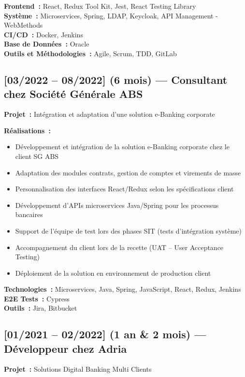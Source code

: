 \textbf{Frontend~:} React, Redux Tool Kit, Jest, React Testing Library\\
\textbf{Système~:} Microservices, Spring, LDAP, Keycloak, API Management - WebMethods\\
\textbf{CI/CD~:} Docker, Jenkins\\
\textbf{Base de Données~:} Oracle\\
\textbf{Outils et Méthodologies~:} Agile, Scrum, TDD, GitLab

\subsection*{[03/2022 -- 08/2022] (6 mois) --- Consultant chez Société Générale ABS}
\vspace{4pt}
\textbf{Projet~:} Intégration et adaptation d'une solution e-Banking corporate

\textbf{Réalisations~:}
\begin{itemize}
    \item Développement et intégration de la solution e-Banking corporate chez le client SG ABS
    \item Adaptation des modules contrats, gestion de comptes et virements de masse
    \item Personnalisation des interfaces React/Redux selon les spécifications client
    \item Développement d'APIs microservices Java/Spring pour les processus bancaires
    \item Support de l'équipe de test lors des phases SIT (tests d'intégration système)
    \item Accompagnement du client lors de la recette (UAT -- User Acceptance Testing)
    \item Déploiement de la solution en environnement de production client
\end{itemize}
\textbf{Technologies~:} Microservices, Java, Spring, JavaScript, React, Redux, Jenkins\\
\textbf{E2E Tests~:} Cypress\\
\textbf{Outils~:} Jira, Bitbucket

\subsection*{[01/2021 -- 02/2022] (1 an \& 2 mois) --- Développeur chez Adria}
\vspace{4pt}
\textbf{Projet~:} Solutions Digital Banking Multi Clients

